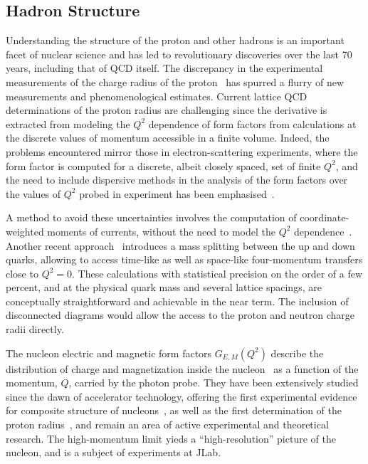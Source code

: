 
\subsection{Hadron Structure}

Understanding the structure of the proton and other hadrons is an important facet of  nuclear science and  has led to revolutionary discoveries over the last 70 years, including that of QCD itself.  
The discrepancy in the experimental measurements of the charge radius of the proton~\cite{Antognini:1900ns} has spurred a flurry of new measurements and phenomenological estimates. Current lattice QCD determinations of the proton radius are challenging since the derivative is extracted from modeling the $Q^2$ dependence of form factors from calculations at the discrete values of momentum accessible in a finite volume.  Indeed, the problems encountered mirror those in electron-scattering experiments, where the form factor is computed for a discrete, albeit closely spaced, set of finite $Q^2$, and the need to include dispersive methods in the analysis of the form factors over the values of $Q^2$ probed in experiment has been emphasised~\cite{Alarcon:2018irp}.

A method to avoid these uncertainties involves the computation of coordinate-weighted moments of currents, without the need to model the $Q^2$ dependence~\cite{Bouchard:2016gmc}. Another recent approach~\cite{Detmold:2018ptb} introduces a mass splitting between the up and down quarks, allowing to access time-like as well as space-like four-momentum transfers close to $Q^2=0$. These calculations with statistical precision on the order of a few percent, and at the physical quark mass and several lattice spacings, are conceptually straightforward and achievable in the near term. The inclusion of disconnected diagrams would allow the access to the proton and neutron charge radii directly.

The nucleon electric and magnetic form factors $G_{E,M}(Q^2)$ describe the distribution of charge and
magnetization inside the
nucleon~\cite{Burkardt:2000za,Burkardt:2002hr,Miller:2007uy,Carlson:2007xd} as a function of the momentum, $Q$, carried by the photon probe.
They have been extensively studied since the dawn of
accelerator technology, offering the first experimental evidence for composite structure 
of nucleons~\cite{Hofstadter:1955ae}, as well as the first
determination of the proton radius~\cite{Chambers:1956zz},
and remain an area of active experimental and theoretical research. The high-momentum limit yieds a ``high-resolution'' picture of the nucleon, and is a subject of experiments at JLab.

